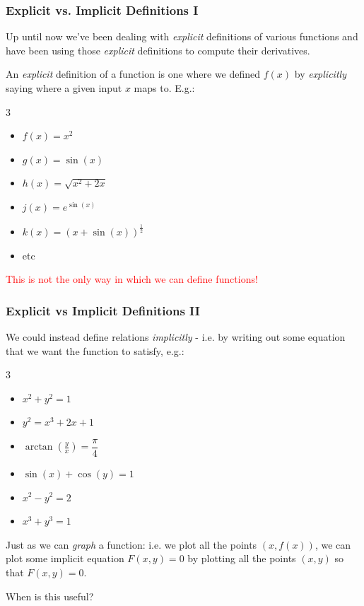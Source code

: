 \documentclass{ltx-talk}
\begin{document}
\begin{frame}
  \frametitle{Explicit vs. Implicit Definitions I} 

  Up until now we've been dealing with \textit{explicit} definitions
  of various functions and have been using those \textit{explicit}
  definitions to compute their derivatives. \pause

  An \textit{explicit} definition of a function is one where
  we defined $f(x)$ by \textit{explicitly} saying where a given input $x$
  maps to. E.g.: \pause

  \begin{multicols}{3}
    \begin{itemize}
      \item $f(x) = x^2$ 
      \item $g(x) = \sin(x)$
      \item $h(x) = \sqrt{x^2 + 2x}$
      \item $j(x) = e^{\sin(x)}$
      \item $k(x) = (x + \sin(x))^{\frac{1}{2}}$
      \item etc
    \end{itemize}
  \end{multicols} \pause

  \textcolor{red}{This is not the only way in which we can define functions!}
\end{frame}

\begin{frame}
  \frametitle{Explicit vs Implicit Definitions II}

  We could instead define relations \textit{implicitly} - 
  i.e. by writing out some equation that we want the function
  to satisfy, e.g.: \pause

  \begin{multicols}{3}
    \begin{itemize}
      \item $x^2 + y^2 = 1$
      \item $y^2 = x^3 + 2x + 1$
      \item $\arctan(\frac{y}{x}) = \dfrac{\pi}{4}$
      \item $\sin(x) + \cos(y) = 1$
      \item $x^2 - y^2 = 2$
      \item $x^3 + y^3 = 1$
    \end{itemize}
  \end{multicols} \pause

  Just as we can \textit{graph} a function:
  i.e. we plot all the points $(x, f(x))$, \pause
  we can plot some implicit equation $F(x, y) = 0$
  by plotting all the points $(x, y)$ so that $F(x, y) = 0$. \pause

  When is this useful?
\end{frame}
\end{document}
